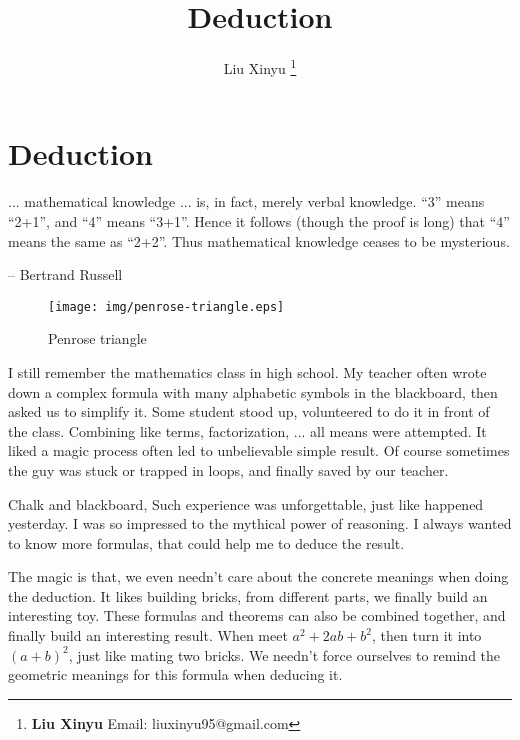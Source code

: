\documentclass{article}
\begin{document}
\title{Deduction}

\author{Liu Xinyu
\thanks{{\bfseries Liu Xinyu} \newline
  Email: liuxinyu95@gmail.com \newline}
  }

\maketitle
\fi


\ifx\wholebook\relax
\chapter{Deduction}
\fi

\epigraph{... mathematical knowledge ... is, in fact, merely verbal knowledge. ``3'' means ``2+1'', and ``4'' means ``3+1''. Hence it follows (though the proof is long) that ``4'' means the same as ``2+2''. Thus mathematical knowledge ceases to be mysterious.}{-- Bertrand Russell}

\begin{wrapfigure}{R}{0.4\textwidth}
 \centering
 \texttt{[image: img/penrose-triangle.eps]}
 \captionsetup{labelformat=empty}
 \caption{Penrose triangle}
 \label{fig:Penrose-triangle}
\end{wrapfigure}

I still remember the mathematics class in high school. My teacher often wrote down a complex formula with many alphabetic symbols in the blackboard, then asked us to simplify it. Some student stood up, volunteered to do it in front of the class. Combining like terms, factorization, ... all means were attempted. It liked a magic process often led to unbelievable simple result. Of course sometimes the guy was stuck or trapped in loops, and finally saved by our teacher.

Chalk and blackboard, Such experience was unforgettable, just like happened yesterday. I was so impressed to the mythical power of reasoning. I always wanted to know more formulas, that could help me to deduce the result.

The magic is that, we even needn't care about the concrete meanings when doing the deduction. It likes building bricks, from different parts, we finally build an interesting toy. These formulas and theorems can also be combined together, and finally build an interesting result. When meet $a^2 + 2ab + b^2$, then turn it into $(a+b)^2$, just like mating two bricks. We needn't force ourselves to remind the geometric meanings for this formula when deducing it.
\end{document}

